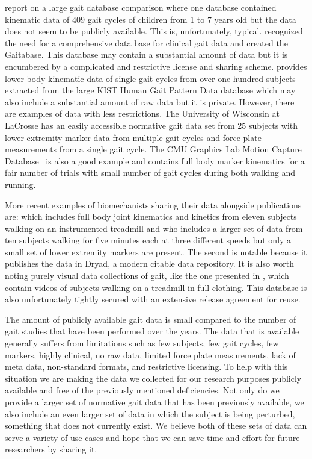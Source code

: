 \documentclass[fleqn,12pt]{wlpeerj}
\begin{document}
\cite{Chester2007} report on a large gait database comparison where one
database contained kinematic data of 409 gait cycles of children from 1 to 7
years old but the data does not seem to be publicly available. This is,
unfortunately, typical. \cite{Tirosh2010} recognized the need for a
comprehensive data base for clinical gait data and created the Gaitabase. This
database may contain a substantial amount of data but it is encumbered by a
complicated and restrictive license and sharing scheme. \cite{Yun2014} provides
lower body kinematic data of single gait cycles from over one hundred subjects
extracted from the large KIST Human Gait Pattern Data database which may also
include a substantial amount of raw data but it is private. However, there are
examples of data with less restrictions. The University of Wisconsin at
LaCrosse has an easily accessible normative gait data set \citep{Willson2014}
from 25 subjects with lower extremity marker data from multiple gait cycles and
force plate measurements from a single gait cycle. The CMU Graphics Lab
Motion Capture Database~\citep{CMU2015} is also a good example and contains
full body marker kinematics for a fair number of trials with small number of
gait cycles during both walking and running.

More recent examples of biomechanists sharing their data alongside publications
are: \cite{Bogert2013} which includes full body joint kinematics and kinetics
from eleven subjects walking on an instrumented treadmill and \cite{Wang2014}
who includes a larger set of data from ten subjects walking for five minutes
each at three different speeds but only a small set of lower extremity markers
are present. The second is notable because it publishes the data in Dryad, a
modern citable data repository. It is also worth noting purely visual data
collections of gait, like the one presented in \cite{Makihara2012}, which
contain videos of subjects walking on a treadmill in full clothing. This
database is also unfortunately tightly secured with an extensive release
agreement for reuse.

The amount of publicly available gait data is small compared to the number of
gait studies that have been performed over the years. The data that is
available generally suffers from limitations such as few subjects, few gait
cycles, few markers, highly clinical, no raw data, limited force plate
measurements, lack of meta data, non-standard formats, and restrictive
licensing. To help with this situation we are making the data we collected for
our research purposes publicly available and free of the previously mentioned
deficiencies. Not only do we provide a larger set of normative gait data that
has been previously available, we also include an even larger set of data in
which the subject is being perturbed, something that does not currently exist.
We believe both of these sets of data can serve a variety of use cases and hope
that we can save time and effort for future researchers by sharing it.
\end{document}
